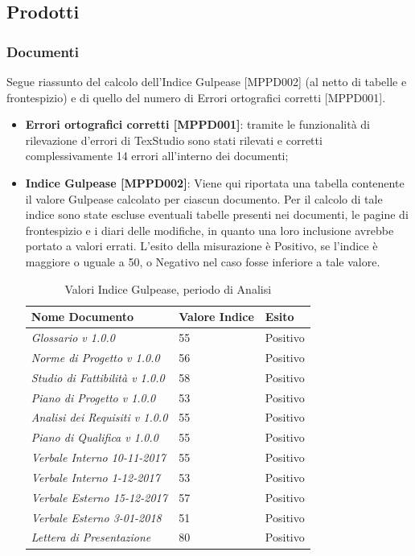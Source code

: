 \documentclass[openany,12pt,a4paper]{report}
\begin{document}
\subsection{Prodotti}

\subsubsection{Documenti}

Segue riassunto del calcolo dell'Indice Gulpease [MPPD002] (al netto di tabelle e frontespizio) e di quello del numero di Errori ortografici corretti [MPPD001].

\begin{itemize}
	\item \textbf{Errori ortografici corretti [MPPD001]}: tramite le funzionalità di rilevazione d'errori di TexStudio sono stati rilevati e corretti complessivamente 14 errori all'interno dei documenti;
	
	\item \textbf{Indice Gulpease [MPPD002]}: Viene qui riportata una tabella contenente il valore Gulpease calcolato per ciascun documento.
	Per il calcolo di tale indice sono state escluse eventuali tabelle presenti nei documenti, le pagine di frontespizio e i diari delle modifiche, in quanto una loro inclusione avrebbe portato a valori errati. L'esito della misurazione è Positivo, se l'indice è maggiore o uguale a 50, o Negativo nel caso fosse inferiore a tale valore.
	
	\begin{table}[h]
		\begin{center}
			\setlength\LTleft{6mm}
			\begin{longtable}{|p{60mm}|p{30mm}|p{25mm}|}
				\hline  
				\textbf{Nome Documento} & \textbf{Valore Indice} & \textbf{Esito} \\ \hline    
				\textit{Glossario v 1.0.0} & 55 & Positivo\\ \hline    
				\textit{Norme di Progetto v 1.0.0} & 56 & Positivo\\ \hline    
				\textit{Studio di Fattibilità v 1.0.0} & 58 & Positivo\\ \hline    
				\textit{Piano di Progetto v 1.0.0} & 53 & Positivo\\ \hline    
				\textit{Analisi dei Requisiti v 1.0.0} & 55 & Positivo\\ \hline    
				\textit{Piano di Qualifica v 1.0.0} & 55 & Positivo\\ \hline    
				\textit{Verbale Interno 10-11-2017} & 55 & Positivo\\ \hline    
				\textit{Verbale Interno 1-12-2017} & 53 & Positivo\\ \hline    
				\textit{Verbale Esterno 15-12-2017} & 57 & Positivo\\ \hline    
				\textit{Verbale Esterno 3-01-2018} & 51 & Positivo\\ \hline   
				\textit{Lettera di Presentazione} & 80 & Positivo\\ \hline
			\end{longtable}
		\end{center}
		\caption{Valori Indice Gulpease, periodo di Analisi} 
	\end{table} 
	

\end{itemize}
\end{document}
